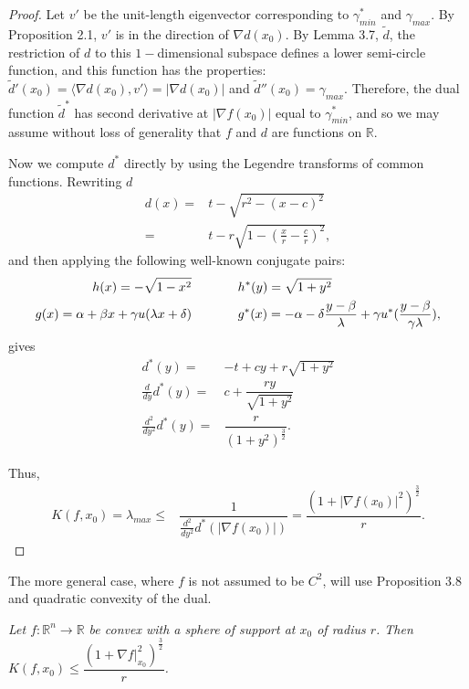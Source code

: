 \documentclass[10pt]{article}
\newenvironment{proposition}[2][Proposition]{\begin{trivlist}
\item[\hskip \labelsep {\bfseries #1}\hskip \labelsep {\bfseries #2.}]}{\end{trivlist}}
\begin{document}
\begin{proof}
Let $v'$ be the unit-length eigenvector corresponding to $\gamma^*_{min}$ and $\gamma_{max}$. By Proposition 2.1, $v'$ is in the direction of $\nabla d(x_0).$ By Lemma 3.7, $\tilde {d}$, the restriction of $d$ to this $1-$dimensional subspace defines a lower semi-circle function, and this function has the properties: $\tilde{d}'(x_0)= \langle \nabla d(x_0),v' \rangle = |\nabla d(x_0)|$ and $\tilde{d}''(x_0) = \gamma_{max}.$ Therefore, the dual function $\tilde{d}^*$ has second derivative at $|\nabla f(x_0)|$ equal to $ \gamma^*_{min}$, and so we may assume without loss of generality that $f$ and $d$ are functions on $\mathbb{R}$.

Now we compute $d^*$ directly by using the Legendre transforms of common functions. Rewriting $d$
\begin{align*}
d(x) = & t - \sqrt{r^2 -(x-c)^2}\\
=& t - r \sqrt{1 -\left(\frac{x}{r}-\frac{c}{r}\right)^2},
\end{align*}
and then applying the following well-known conjugate pairs:
\begin{align*}
h(x)= - \sqrt{1-x^2} &\hspace{.5 in} h^*(y)=\sqrt{1+y^2}\\
g(x)= \alpha + \beta x + \gamma u(\lambda x + \delta) & \hspace{.5 in} g^*(x)= -\alpha -\delta \dfrac{y-\beta}{\lambda} + \gamma u^*(\dfrac{y- \beta}{\gamma \lambda}),
\end{align*}
gives
\begin{align*}
d^{*}(y)=& -t +cy + r \sqrt{1+y^2}\\
\frac{d}{dy}d^{*}(y)=& c + \dfrac{ry}{\sqrt{1+y^2}}\\
\frac{d^2}{dy^2} d^{*}(y)=& \dfrac{r}{(1+y^2)^\frac{3}{2}}.
\end{align*}

Thus,
\begin{align*}
K(f,x_0)=\lambda_{max} \leq & \dfrac{1}{ \frac{d^2}{dy^2} d^{*}(|\nabla f(x_0)|)}= \dfrac{(1+|\nabla f(x_0)|^2)^\frac{3}{2}}{r}.
\end{align*}
\end{proof}
The more general case, where $f$ is not assumed to be $C^2$, will use Proposition 3.8 and quadratic convexity of the dual.
\begin{proposition}{3.9}
\textit{Let $f:\mathbb{R}^n \rightarrow \mathbb{R}$ be convex with a sphere of support at $x_0$ of radius $r$. Then $K(f,x_0) \leq \dfrac{(1+\nabla f|_{x_0}^2)^\frac{3}{2}}{r}$.}
\end{proposition}
\end{document}

